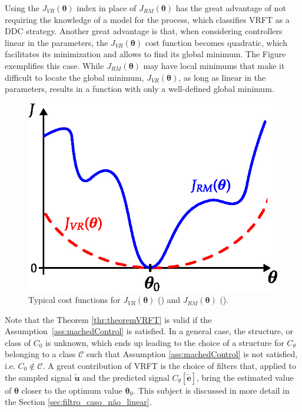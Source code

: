 Using the $J_{VR}(\bm{\theta})$ index in place of $J_{RM}(\bm{\theta})$ has the great advantage of not requiring the knowledge of a model for the process, which classifies VRFT as a DDC strategy. Another great advantage is that, when considering controllers linear in the parameters, the $J_{VR}(\bm{\theta})$ cost function becomes quadratic, which facilitates its minimization and allows to find its global minimum. The Figure  exemplifies this case. While $J_{RM}(\bm{\theta})$ may have local minimums that make it difficult to locate the global minimum, $J_{VR}(\bm{\theta})$, as long as linear in the parameters, results in a function with only a well-defined global minimum.
\begin{figure}[htpb]
    
   \centering
   \includegraphics{Figs/JVR_JRM_plot.eps}
   \caption{Typical cost functions for $J_{VR}(\bm{\theta})$ () and $J_{RM}(\bm{\theta})$ ().}
   \label{fig:JVR_JRM_plot}
\end{figure}

Note that the Theorem \ref{thr:theoremVRFT} is valid if the Assumption~\ref{ass:machedControl} is satisfied. In a general case, the structure, or class of $C_0$ is unknown, which ends up leading to the choice of a structure for $C_\theta$ belonging to a class $\mathscr{C}$ such that Assumption \ref{ass:machedControl} is not satisfied, i.e. $C_0 \notin \mathscr{C} $.
A great contribution of VRFT is the choice of filters that, applied to the sampled signal $\tilde{\bm{u}}$ and the predicted signal $C_\theta[\tilde{\bm{e}}]$, bring the estimated value of $\bm{\theta}$ closer to the optimum value $\bm{\theta}_0$. This subject is discussed in more detail in the Section \ref{sec:filtro_caso_não_linear}.

